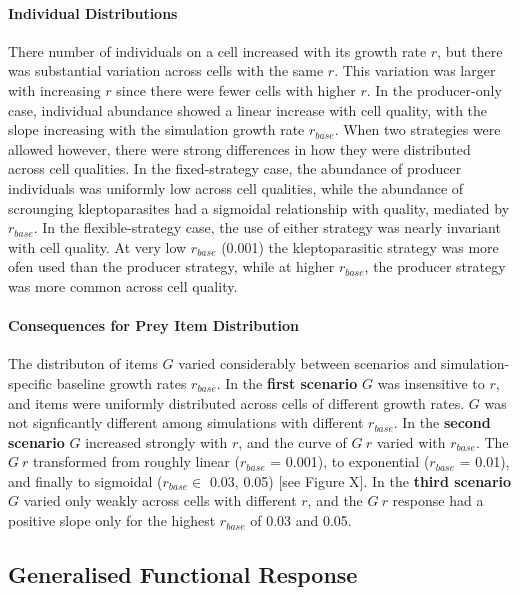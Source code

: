 \documentclass[11pt]{article}
\begin{document}
\paragraph{Individual Distributions}

There number of individuals on a cell increased with its growth rate $r$, but there was substantial variation across cells with the same $r$. 
This variation was larger with increasing $r$ since there were fewer cells with higher $r$.
In the producer-only case, individual abundance showed a linear increase with cell quality, with the slope increasing with the simulation growth rate $r_{base}$.
When two strategies were allowed however, there were strong differences in how they were distributed across cell qualities.
In the fixed-strategy case, the abundance of producer individuals was uniformly low across cell qualities, while the abundance of scrounging kleptoparasites had a sigmoidal relationship with quality, mediated by $r_{base}$.
In the flexible-strategy case, the use of either strategy was nearly invariant with cell quality.
At very low $r_{base}$ (0.001) the kleptoparasitic strategy was more ofen used than the producer strategy, while at higher $r_{base}$, the producer strategy was more common across cell quality.

\paragraph{Consequences for Prey Item Distribution}

The distributon of items $G$ varied considerably between scenarios and simulation-specific baseline growth rates $r_{base}$.
In the \textbf{first scenario} $G$ was insensitive to $r$, and items were uniformly distributed across cells of different growth rates.
$G$ was not signficantly different among simulations with different $r_{base}$.
In the \textbf{second scenario} $G$ increased strongly with $r$, and the curve of $G ~ r$ varied with $r_{base}$.
The $G ~ r$ transformed from roughly linear ($r_{base}$ = 0.001), to exponential ($r_{base}$ = 0.01), and finally to sigmoidal ($r_{base} \in$ 0.03, 0.05) [see Figure X].
In the \textbf{third scenario} $G$ varied only weakly across cells with different $r$, and the $G ~ r$ response had a positive slope only for the highest $r_{base}$ of 0.03 and 0.05.

\subsection*{Generalised Functional Response}
\end{document}
